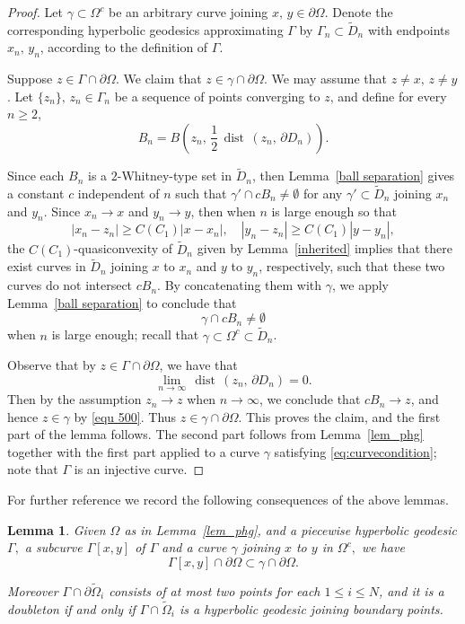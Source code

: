 \documentclass[reqno,11pt]{amsart}
\makeatletter
\def\dist{{\mathop\mathrm{\,dist\,}}}
\def\wz{\widetilde}
\newtheorem{lem}[thm]{Lemma}%
\numberwithin{equation}{section}
\theoremstyle{remark}
\makeatother
\begin{document}
\begin{proof}
Let $\gamma\subset \Omega^c$ be an arbitrary curve joining $x,\,
y\in \partial\Omega$. 
Denote the corresponding   hyperbolic geodesics approximating 
$\Gamma$ by $\Gamma_n\subset \wz D_n$ with endpoints $x_n,\,y_n$, according to the definition of 
$\Gamma$. 


Suppose $z\in \Gamma\cap \partial \Omega$. 
We claim that $z\in \gamma\cap \partial \Omega$. We may assume that $z\neq x,\, z\neq y$. 
Let $\{z_n\},\,z_n\in \Gamma_n$ be a sequence of points converging to $z$, 
and define for every $n\ge 2$, $$B_n=B\left(z_n,\,\frac 1 2 
\dist(z_n,\,\partial D_n)\right). $$


Since each $B_n$ is a $2$-Whitney-type set in $\wz D_n$, then Lemma~\ref{ball separation} gives a constant $c$ independent of $n$ such that 
$\gamma'\cap cB_n\neq\emptyset$ for any $\gamma'\subset \wz D_n$ joining $x_n$ and $y_n$.  
Since $x_n\to x$ and $y_n \to y$, then when $n$ is large enough so that
$$ |x_n-z_n|\ge C(C_1)|x-x_n|,\quad|y_n-z_n|\ge C(C_1)|y-y_n|,$$
the $C(C_1)$-quasiconvexity of $\wz D_n$ given by Lemma~\ref{inherited}
implies that there exist curves in $\wz D_n$ joining $x$ to $x_n$ and $y$ to $y_n$, respectively, such that these two curves do not intersect $c B_n$. 
By concatenating  them with $\gamma$, we apply Lemma~\ref{ball separation}  to conclude that 
\begin{equation}\label{equ 500}
\gamma\cap c B_n\neq \emptyset
\end{equation}
 when $n$ is large enough; recall that $\gamma\subset  \Omega^c\subset \wz D_n$. 

Observe that by $z\in \Gamma\cap \partial \Omega$, 
we have that $$\lim_{n\to \infty}\dist(z_n,\,\partial D_n)= 0. $$
Then by the assumption $z_n\to z$ when $n\to \infty$, 
we conclude that $cB_n\to z$, and hence $z\in \gamma$ by \eqref{equ 500}. 
Thus $z\in \gamma\cap \partial \Omega$. This proves the claim, and the 
first part of the lemma follows. The second part follows from 
Lemma~\ref{lem_phg} together with the first part applied to a curve $\gamma$
satisfying \eqref{eq:curvecondition}; note that $\Gamma$ is an injective curve. 
\end{proof}

For further reference we record the following consequences of the above lemmas.

\begin{lem} \label{parempi}
Given $\Omega$ as in Lemma~\ref{lem_phg}, and a piecewise hyperbolic geodesic $\Gamma,$ a subcurve
$\Gamma[x,y]$ of $\Gamma$ and a curve $\gamma$ joining $x$ to $y$ in $\Omega^c,$ we
have
$$\Gamma[x,y]\cap \partial \Omega\subset \gamma\cap \partial \Omega.$$


Moreover  $\Gamma\cap \partial \wz\Omega_i$ consists of  at most two points for each $1\le i\le N$, and it is a doubleton if and only if $\Gamma \cap \wz\Omega_i$ is a hyperbolic geodesic joining boundary points. 
\end{lem}
\end{document}
